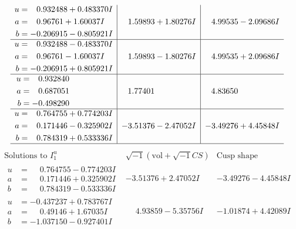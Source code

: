 \documentclass[1p]{elsarticle_modified}
\theoremstyle{definition}
\newcommand{\I}{\sqrt{-1}}
\begin{document}
$$\begin{array}{c|c|c}
\begin{aligned}
u &= \phantom{-}0.932488 + 0.483370 I \\
a &= \phantom{-}0.96761 + 1.60037 I \\
b &= -0.206915 - 0.805921 I\end{aligned}
 & \phantom{-}1.59893 + 1.80276 I & \phantom{-}4.99535 - 2.09686 I \\ \hline\begin{aligned}
u &= \phantom{-}0.932488 - 0.483370 I \\
a &= \phantom{-}0.96761 - 1.60037 I \\
b &= -0.206915 + 0.805921 I\end{aligned}
 & \phantom{-}1.59893 - 1.80276 I & \phantom{-}4.99535 + 2.09686 I \\ \hline\begin{aligned}
u &= \phantom{-}0.932840\phantom{ +0.000000I} \\
a &= \phantom{-}0.687051\phantom{ +0.000000I} \\
b &= -0.498290\phantom{ +0.000000I}\end{aligned}
 & \phantom{-}1.77401\phantom{ +0.000000I} & \phantom{-}4.83650\phantom{ +0.000000I} \\ \hline\begin{aligned}
u &= \phantom{-}0.764755 + 0.774203 I \\
a &= \phantom{-}0.171446 - 0.325902 I \\
b &= \phantom{-}0.784319 + 0.533336 I\end{aligned}
 & -3.51376 - 2.47052 I & -3.49276 + 4.45848 I\\
 \hline 
 \end{array}$$\newpage$$\begin{array}{c|c|c}  
\text{Solutions to }I^u_{1}& \I (\text{vol} + \sqrt{-1}CS) & \text{Cusp shape}\\
 \hline 
\begin{aligned}
u &= \phantom{-}0.764755 - 0.774203 I \\
a &= \phantom{-}0.171446 + 0.325902 I \\
b &= \phantom{-}0.784319 - 0.533336 I\end{aligned}
 & -3.51376 + 2.47052 I & -3.49276 - 4.45848 I \\ \hline\begin{aligned}
u &= -0.437237 + 0.783767 I \\
a &= \phantom{-}0.49146 + 1.67035 I \\
b &= -1.037150 - 0.927401 I\end{aligned}
 & \phantom{-}4.93859 - 5.35756 I & -1.01874 + 4.42089 I \\ \hline\begin{aligned}

\end{aligned}
\end{array}$$
\end{document}
